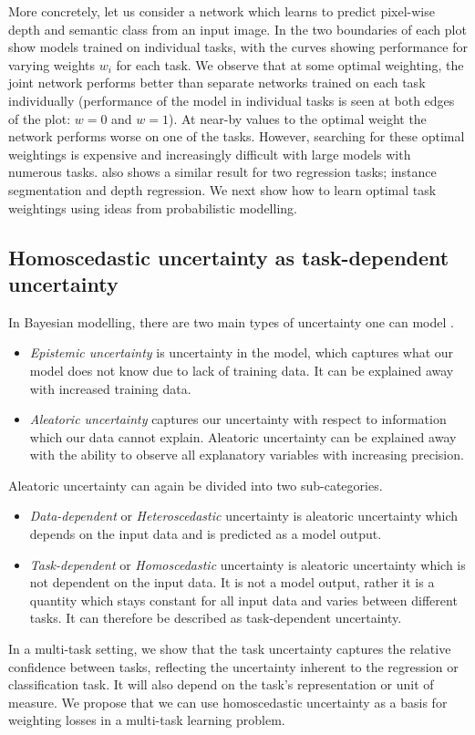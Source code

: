 More concretely, let us consider a network which learns to predict pixel-wise depth and semantic class from an input image. In  the two boundaries of each plot show models trained on individual tasks, with the curves showing performance for varying weights $w_i$ for each task. We observe that at some optimal weighting, the joint network performs better than separate networks trained on each task individually (performance of the model in individual tasks is seen at both edges of the plot: $w=0$ and $w=1$). At near-by values to the optimal weight the network performs worse on one of the tasks. However, searching for these optimal weightings is expensive and increasingly difficult with large models with numerous tasks.  also shows a similar result for two regression tasks; instance segmentation and depth regression. We next show how to learn optimal task weightings using ideas from probabilistic modelling.

\subsection{Homoscedastic uncertainty as task-dependent uncertainty}
\label{sec:uncertainty}

In Bayesian modelling, there are two main types of uncertainty one can model \cite{kendall2017uncertainties}.
\begin{itemize}
\item \textit{Epistemic uncertainty} is uncertainty in the model, which captures what our model does not know due to lack of training data. It can be explained away with increased training data.
\item \textit{Aleatoric uncertainty} captures our uncertainty with respect to information which our data cannot explain. Aleatoric uncertainty can be explained away with the ability to observe all explanatory variables with increasing precision.
\end{itemize}
Aleatoric uncertainty can again be divided into two sub-categories.
\begin{itemize}
\item \textit{Data-dependent} or \textit{Heteroscedastic} uncertainty is aleatoric uncertainty which depends on the input data and is predicted as a model output.
\item \textit{Task-dependent} or \textit{Homoscedastic} uncertainty is  aleatoric uncertainty which is not dependent on the input data. It is not a model output, rather it is a quantity which stays constant for all input data and varies between different tasks. It can therefore be described as task-dependent uncertainty.
\end{itemize}
In a multi-task setting, we show that the task uncertainty captures the relative confidence between tasks, reflecting the uncertainty inherent to the regression or classification task. It will also depend on the task's representation or unit of measure.  We propose that we can use homoscedastic uncertainty as a basis for weighting losses in a multi-task learning problem.

